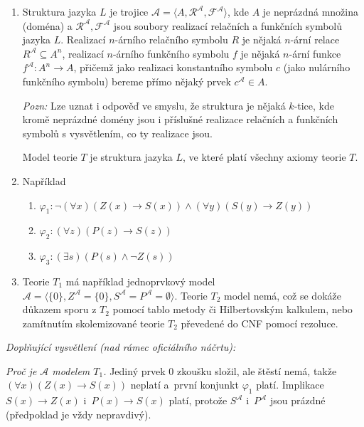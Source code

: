 \begin{enumerate}
  \item Struktura jazyka $L$ je trojice $\mathcal{A} = \langle A, \mathcal{R}^{\mathcal{A}}, \mathcal{F}^{\mathcal{A}} \rangle$, kde $A$ je neprázdná množina (doména) a $\mathcal{R}^{\mathcal{A}}, \mathcal{F}^{\mathcal{A}}$ jsou soubory realizací relačních a funkčních symbolů jazyka $L$. Realizací $n$-árního relačního symbolu $R$ je nějaká $n$-ární relace $R^{\mathcal{A}} \subseteq A^n$, realizací $n$-árního funkčního symbolu $f$ je nějaká $n$-ární funkce $f^{\mathcal{A}} \colon A^n \to A$, přičemž jako realizaci konstantního symbolu $c$ (jako nulárního funkčního symbolu) bereme přímo nějaký prvek $c^{\mathcal{A}} \in A$.

  \emph{Pozn:} Lze uznat i odpověď ve smyslu, že struktura je nějaká $k$-tice, kde kromě neprázdné domény jsou i příslušné realizace relačních a funkčních symbolů s vysvětlením, co ty realizace jsou.

  Model teorie $T$ je struktura jazyka $L$, ve které platí všechny axiomy teorie $T$.

  \item Například
  \begin{enumerate}
    \item[(a)] $\varphi_1 : \neg(\forall x)(Z(x) \to S(x)) \land (\forall y)(S(y) \to Z(y))$
    \item[(b)] $\varphi_2 : (\forall z)(P(z) \to S(z))$
    \item[(c)] $\varphi_3 : (\exists s)(P(s) \land \neg Z(s))$
  \end{enumerate}

  \item Teorie $T_1$ má například jednoprvkový model $\mathcal{A} = \langle \{0\}, Z^{\mathcal{A}} = \{0\}, S^{\mathcal{A}} = P^{\mathcal{A}} = \emptyset \rangle$. Teorie $T_2$ model nemá, což se dokáže důkazem sporu z $T_2$ pomocí tablo metody či Hilbertovským kalkulem, nebo zamítnutím skolemizované teorie $T_2$ převedené do CNF pomocí rezoluce.
\end{enumerate}

\medskip
\noindent\textit{Doplňující vysvětlení (nad rámec oficiálního náčrtu):}

\noindent\emph{Proč je $\mathcal{A}$ modelem $T_1$.} Jediný prvek $0$ zkoušku složil, ale štěstí nemá, takže $(\forall x)(Z(x)\to S(x))$ neplatí a~první konjunkt $\varphi_1$ platí. Implikace $S(x)\to Z(x)$ i~$P(x)\to S(x)$ platí, protože $S^{\mathcal{A}}$ i~$P^{\mathcal{A}}$ jsou prázdné (předpoklad je vždy nepravdivý).

